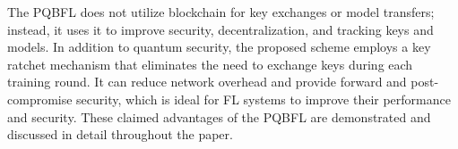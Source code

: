 The PQBFL does not utilize blockchain for key exchanges or model transfers; instead, it uses it to improve security, decentralization, and tracking keys and models.  
In addition to quantum security, the proposed scheme employs a key ratchet mechanism that eliminates the need to exchange keys during each training round.  
It can reduce network overhead and provide forward and post-compromise security, which is ideal for FL systems to improve their performance and security.  
These claimed advantages of the PQBFL are demonstrated and discussed in detail throughout the paper.


